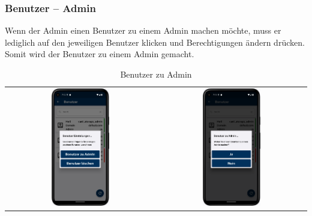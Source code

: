 \newpage

\subsubsection{Benutzer – Admin}  \label{subsubsec:userAdmin}
Wenn der Admin einen Benutzer zu einem Admin machen möchte, muss er lediglich auf den jeweiligen Benutzer klicken und Berechtigungen ändern drücken. Somit wird der Benutzer zu einem Admin gemacht.

\vspace{1cm}
\begin{table}[htbp]
  \centering
  \begin{tabular}{cc}
    \includegraphics[width=0.4\textwidth]{FLUTTER/images/ZB/user_page_selector.png} &
    \includegraphics[width=0.4\textwidth]{FLUTTER/images/ZB/user_admin.png} \\
  \end{tabular}
  \label{tab:example}
  \captionsetup{type=figure}
  \caption{Benutzer zu Admin}
\end{table}

